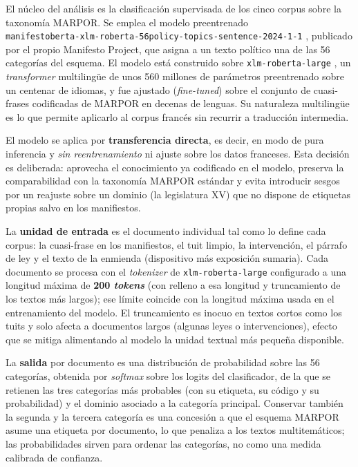 El núcleo del análisis es la clasificación supervisada de los cinco corpus sobre
la taxonomía MARPOR. Se emplea el modelo preentrenado \\
\texttt{manifestoberta-xlm-roberta-56policy-topics-sentence-2024-1-1}
\cite{manifestoberta2024}, publicado por el propio Manifesto Project, que asigna
a un texto político una de las 56 categorías del esquema. El modelo está
construido sobre \texttt{xlm-roberta-large} \cite{conneau2020xlmr}, un
\emph{transformer} multilingüe de unos 560 millones de parámetros preentrenado
sobre un centenar de idiomas, y fue ajustado (\emph{fine-tuned}) sobre el
conjunto de cuasi-frases codificadas de MARPOR en decenas de lenguas. Su
naturaleza multilingüe es lo que permite aplicarlo al corpus francés sin recurrir
a traducción intermedia.

El modelo se aplica por \textbf{transferencia directa}, es decir, en modo de pura
inferencia y \emph{sin reentrenamiento} ni ajuste sobre los datos franceses. Esta
decisión es deliberada: aprovecha el conocimiento ya codificado en el modelo,
preserva la comparabilidad con la taxonomía MARPOR estándar y evita introducir
sesgos por un reajuste sobre un dominio (la legislatura XV) que no dispone de
etiquetas propias salvo en los manifiestos.

La \textbf{unidad de entrada} es el documento individual tal como lo define cada
corpus: la cuasi-frase en los manifiestos, el tuit limpio, la intervención, el
párrafo de ley y el texto de la enmienda (dispositivo más exposición sumaria).
Cada documento se procesa con el \emph{tokenizer} de
\texttt{xlm-roberta-large} configurado a una longitud máxima de \textbf{200
\emph{tokens}} (con relleno a esa longitud y truncamiento de los textos más
largos); ese límite coincide con la longitud máxima usada en el entrenamiento del
modelo. El truncamiento es inocuo en textos cortos como los tuits y solo afecta a
documentos largos (algunas leyes o intervenciones), efecto que se mitiga
alimentando al modelo la unidad textual más pequeña disponible.

La \textbf{salida} por documento es una distribución de probabilidad sobre las 56
categorías, obtenida por \emph{softmax} sobre los logits del clasificador, de la
que se retienen las tres categorías más probables (con su etiqueta, su código y
su probabilidad) y el dominio asociado a la categoría principal. Conservar
también la segunda y la tercera categoría es una concesión a que el esquema
MARPOR asume una etiqueta por documento, lo que penaliza a los textos
multitemáticos; las probabilidades sirven para ordenar las categorías, no como
una medida calibrada de confianza.

